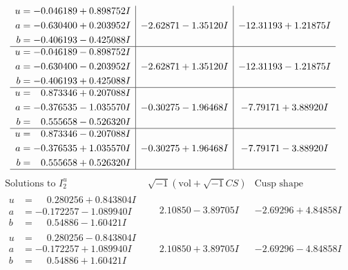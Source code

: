 \documentclass[1p]{elsarticle_modified}
\theoremstyle{definition}
\newcommand{\I}{\sqrt{-1}}
\begin{document}
$$\begin{array}{c|c|c}
\begin{aligned}
u &= -0.046189 + 0.898752 I \\
a &= -0.630400 + 0.203952 I \\
b &= -0.406193 - 0.425088 I\end{aligned}
 & -2.62871 - 1.35120 I & -12.31193 + 1.21875 I \\ \hline\begin{aligned}
u &= -0.046189 - 0.898752 I \\
a &= -0.630400 - 0.203952 I \\
b &= -0.406193 + 0.425088 I\end{aligned}
 & -2.62871 + 1.35120 I & -12.31193 - 1.21875 I \\ \hline\begin{aligned}
u &= \phantom{-}0.873346 + 0.207088 I \\
a &= -0.376535 - 1.035570 I \\
b &= \phantom{-}0.555658 - 0.526320 I\end{aligned}
 & -0.30275 - 1.96468 I & -7.79171 + 3.88920 I \\ \hline\begin{aligned}
u &= \phantom{-}0.873346 - 0.207088 I \\
a &= -0.376535 + 1.035570 I \\
b &= \phantom{-}0.555658 + 0.526320 I\end{aligned}
 & -0.30275 + 1.96468 I & -7.79171 - 3.88920 I\\
 \hline 
 \end{array}$$\newpage$$\begin{array}{c|c|c}  
\text{Solutions to }I^u_{2}& \I (\text{vol} + \sqrt{-1}CS) & \text{Cusp shape}\\
 \hline 
\begin{aligned}
u &= \phantom{-}0.280256 + 0.843804 I \\
a &= -0.172257 - 1.089940 I \\
b &= \phantom{-}0.54886 - 1.60421 I\end{aligned}
 & \phantom{-}2.10850 - 3.89705 I & -2.69296 + 4.84858 I \\ \hline\begin{aligned}
u &= \phantom{-}0.280256 - 0.843804 I \\
a &= -0.172257 + 1.089940 I \\
b &= \phantom{-}0.54886 + 1.60421 I\end{aligned}
 & \phantom{-}2.10850 + 3.89705 I & -2.69296 - 4.84858 I \\ \hline\begin{aligned}

\end{aligned}
\end{array}$$
\end{document}
